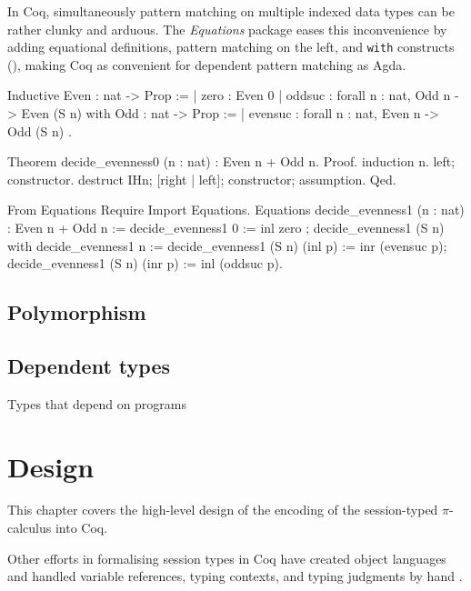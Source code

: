 \documentclass{mproj}
\newcommand{\picalc}{$\pi$-calculus}
\begin{document}
In Coq, simultaneously pattern matching on multiple indexed data types can be rather clunky and arduous. The \emph{Equations} package eases this inconvenience by adding equational definitions, pattern matching on the left, and \texttt{with} constructs (\cite{McBride2004}), making Coq as convenient for dependent pattern matching as Agda.

\begin{coq}
Inductive Even : nat -> Prop :=
| zero : Even 0
| oddsuc : forall {n : nat}, Odd n -> Even (S n)
with Odd : nat -> Prop :=
| evensuc : forall {n : nat}, Even n -> Odd (S n)
.

Theorem decide_evenness0 (n : nat) : Even n + Odd n.
Proof.
  induction n.
  left; constructor.
  destruct IHn; [right | left]; constructor; assumption.
Qed.

From Equations Require Import Equations.
Equations decide_evenness1 (n : nat) : Even n + Odd n := {
decide_evenness1 0 := inl zero ;
decide_evenness1 (S n) with decide_evenness1 n := {
decide_evenness1 (S n) (inl p) := inr (evensuc p);
decide_evenness1 (S n) (inr p) := inl (oddsuc p)}}.
\end{coq}


\section{Polymorphism}\label{polymorphism}

\cite{Wadler1989}

\section{Dependent types}\label{dependent-types}

Types that depend on programs

\chapter{Design}\label{design}

This chapter covers the high-level design of the encoding of the session-typed \picalc{} into Coq. 

Other efforts in formalising session types in Coq have created object languages and handled variable references, typing contexts, and typing judgments by hand \cite{Dilmore2019}.
\end{document}
